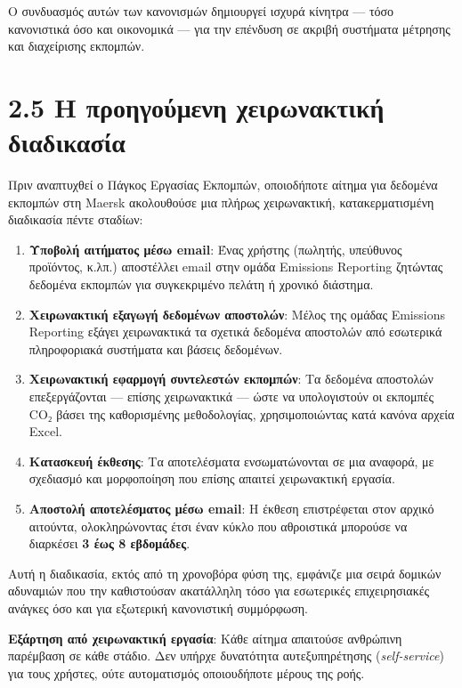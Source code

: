 Ο συνδυασμός αυτών των κανονισμών δημιουργεί ισχυρά κίνητρα --- τόσο
κανονιστικά όσο και οικονομικά --- για την επένδυση σε ακριβή συστήματα
μέτρησης και διαχείρισης εκπομπών.

\section{2.5 Η προηγούμενη χειρωνακτική
διαδικασία}\label{ux3b7-ux3c0ux3c1ux3bfux3b7ux3b3ux3bfux3cdux3bcux3b5ux3bdux3b7-ux3c7ux3b5ux3b9ux3c1ux3c9ux3bdux3b1ux3baux3c4ux3b9ux3baux3ae-ux3b4ux3b9ux3b1ux3b4ux3b9ux3baux3b1ux3c3ux3afux3b1}

Πριν αναπτυχθεί ο Πάγκος Εργασίας Εκπομπών, οποιοδήποτε αίτημα για
δεδομένα εκπομπών στη Maersk ακολουθούσε μια πλήρως χειρωνακτική,
κατακερματισμένη διαδικασία πέντε σταδίων:

\begin{enumerate}
\def\labelenumi{\arabic{enumi}.}
\tightlist
\item
  \textbf{Υποβολή αιτήματος μέσω email}: Ένας χρήστης (πωλητής,
  υπεύθυνος προϊόντος, κ.λπ.) αποστέλλει email στην ομάδα Emissions
  Reporting ζητώντας δεδομένα εκπομπών για συγκεκριμένο πελάτη ή χρονικό
  διάστημα.
\item
  \textbf{Χειρωνακτική εξαγωγή δεδομένων αποστολών}: Μέλος της ομάδας
  Emissions Reporting εξάγει χειρωνακτικά τα σχετικά δεδομένα αποστολών
  από εσωτερικά πληροφοριακά συστήματα και βάσεις δεδομένων.
\item
  \textbf{Χειρωνακτική εφαρμογή συντελεστών εκπομπών}: Τα δεδομένα
  αποστολών επεξεργάζονται --- επίσης χειρωνακτικά --- ώστε να
  υπολογιστούν οι εκπομπές CO₂ βάσει της καθορισμένης μεθοδολογίας,
  χρησιμοποιώντας κατά κανόνα αρχεία Excel.
\item
  \textbf{Κατασκευή έκθεσης}: Τα αποτελέσματα ενσωματώνονται σε μια
  αναφορά, με σχεδιασμό και μορφοποίηση που επίσης απαιτεί χειρωνακτική
  εργασία.
\item
  \textbf{Αποστολή αποτελέσματος μέσω email}: Η έκθεση επιστρέφεται στον
  αρχικό αιτούντα, ολοκληρώνοντας έτσι έναν κύκλο που αθροιστικά
  μπορούσε να διαρκέσει \textbf{3 έως 8 εβδομάδες}.
\end{enumerate}

Αυτή η διαδικασία, εκτός από τη χρονοβόρα φύση της, εμφάνιζε μια σειρά
δομικών αδυναμιών που την καθιστούσαν ακατάλληλη τόσο για εσωτερικές
επιχειρησιακές ανάγκες όσο και για εξωτερική κανονιστική συμμόρφωση.

\textbf{Εξάρτηση από χειρωνακτική εργασία}: Κάθε αίτημα απαιτούσε
ανθρώπινη παρέμβαση σε κάθε στάδιο. Δεν υπήρχε δυνατότητα
αυτεξυπηρέτησης (\emph{self-service}) για τους χρήστες, ούτε
αυτοματισμός οποιουδήποτε μέρους της ροής.

